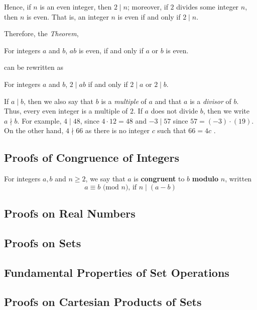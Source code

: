 Hence, if $n$ is an even integer, then $2 \mid n$; moreover, if $2$ divides some
integer $n$, then $n$ is even. That is, an integer $n$ is even if and only if $2
\mid n$.

Therefore, the \emph{Theorem},
\begin{center}
     For integers $a$ and $b$, $ab$ is even, if and only if $a$ or $b$ is even. 
\end{center}
can be rewritten as
\begin{center}
     For integers $a$ and $b$, $2 \mid ab$ if and only if $2 \mid a$ or $2 \mid b$.
\end{center}

If $a \mid b$, then we also say that $b$ is a \emph{multiple} of $a$ and that
$a$ is a \emph{divisor} of $b$. Thus, every even integer is a multiple of $2$.
If $a$ does not divide $b$, then we write $a \nmid b$. 
\medbreak
For example, $4 \mid 48$, since $4 \cdot 12 = 48$ and $-3 \mid 57$ since $57 =
(-3) \cdot (19)$. On the other hand, $4\nmid 66$ as there is no integer $c$ such
that $66 = 4c$   .
\subsection{Proofs of Congruence of Integers }
\begin{defi}
    For integers $a, b$ and $n \geq 2$, we say that $a$ is \textbf{congruent} to
    $b$ \textbf{modulo} $n$, written
    \[a \equiv b\text{ (mod $n$), if }n \mid (a-b)\]
\end{defi}
\subsection{Proofs on Real Numbers}
\subsection{Proofs on Sets}
\subsection{Fundamental Properties of Set Operations}
\subsection{Proofs on Cartesian Products of Sets}


